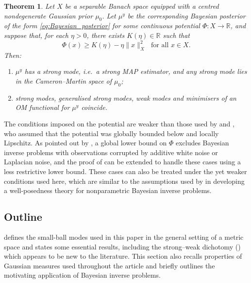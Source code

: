 \documentclass[11pt]{article}
\newcommand*{\Reals}{\mathbb{R}}
\renewcommand*{\geq}{\geqslant}
\theoremstyle{plain}
\newtheorem{theorem}{Theorem}[section]
\theoremstyle{definition}
\numberwithin{equation}{section}
\numberwithin{figure}{section}
\numberwithin{table}{section}
\begin{document}
\begin{theorem}
	\label{thm:main}
	Let $X$ be a separable Banach space equipped with a centred nondegenerate Gaussian prior $\mu_0$.
	Let $\mu^y$ be the corresponding Bayesian posterior of the form \eqref{eq:Bayesian_posterior} for some continuous potential $\Phi \colon X \to \Reals$, and suppose that, for each $\eta > 0$, there exists $K(\eta) \in \Reals$ such that
	\begin{equation} \label{eq:Phi_lower_bound}
		\Phi(x) \geq K(\eta) - \eta\|x\|_X^{2} \text{~~for all $x \in X$.}
	\end{equation}
	Then:
	\begin{enumerate}[label=(\alph*)]
		\item $\mu^y$ has a strong mode, i.e.\ a strong MAP estimator, and any strong mode lies in the Cameron--Martin space of $\mu_0$;
		\item strong modes, generalised strong modes, weak modes and minimisers of an OM functional for $\mu^y$ coincide.
	\end{enumerate}
\end{theorem}

The conditions imposed on the potential are weaker than those used by \citet{DashtiLawStuartVoss2013} and \citet{KlebanovWacker2022}, who assumed that the potential was globally bounded below and locally Lipschitz.
As pointed out by \citet{Kretschmann2019,Kretschmann2022}, a global lower bound on $\Phi$ excludes Bayesian inverse problems with observations corrupted by additive white noise or Laplacian noise, and the proof of \citet{DashtiLawStuartVoss2013} can be extended to handle these cases using a less restrictive lower bound.
These cases can also be treated under the yet weaker conditions used here, which are similar to the assumptions used by \citet[Assumption~2.6]{Stuart2010} in developing a well-posedness theory for nonparametric Bayesian inverse problems.

\subsection{Outline} 
 defines the small-ball modes used in this paper in the general setting of a metric space and states some essential results, including the strong--weak dichotomy () which appears to be new to the literature.
This section also recalls properties of Gaussian measures used throughout the article and briefly outlines the motivating application of Bayesian inverse problems.
\end{document}
